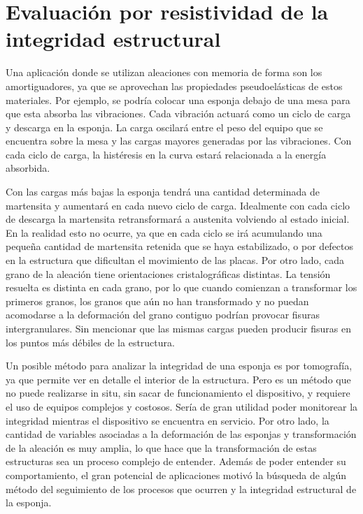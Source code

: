 \documentclass[a4paper,12pt,fleqn,twoside,openany]{book}
\begin{document}
\section{Evaluación por resistividad de la integridad estructural}


Una aplicación donde se utilizan aleaciones con memoria de forma son los amortiguadores, ya que se aprovechan las propiedades pseudoelásticas de estos materiales. Por ejemplo, se podría colocar una esponja debajo de una mesa para que esta absorba las vibraciones. Cada vibración actuará como un ciclo de carga y descarga en la esponja. 
La carga oscilará entre el peso del equipo que se encuentra sobre la mesa y las cargas mayores generadas por las vibraciones.
Con cada ciclo de carga, la histéresis en la curva estará relacionada a la energía absorbida.  

Con las cargas más bajas la esponja tendrá una cantidad determinada de martensita y aumentará en cada nuevo ciclo de carga. Idealmente con cada ciclo de descarga la martensita retransformará a austenita volviendo al estado inicial. En la realidad esto no ocurre, ya que en cada ciclo se irá acumulando una pequeña cantidad de martensita retenida que se haya estabilizado, o por defectos en la estructura que dificultan el movimiento de las placas. Por otro lado, cada grano de la aleación tiene orientaciones cristalográficas distintas. La tensión resuelta es distinta en cada grano, por lo que cuando comienzan a transformar los primeros granos, los granos que aún no han transformado y no puedan acomodarse a la deformación del grano contiguo podrían provocar fisuras intergranulares. Sin mencionar que las mismas cargas pueden producir fisuras en los puntos más débiles de la estructura. 

Un posible método para analizar la integridad de una esponja es por tomografía, ya que permite ver en detalle el interior de la estructura. Pero es un método  que no puede realizarse in situ, sin sacar de funcionamiento el dispositivo, y requiere el uso de equipos complejos y costosos. Sería de gran utilidad poder monitorear la integridad mientras el dispositivo se encuentra en servicio. Por otro lado, la cantidad de variables asociadas a la deformación de las esponjas y transformación de la aleación es muy amplia, lo que hace que la transformación de estas estructuras sea un proceso complejo de entender. Además de poder entender su comportamiento, el gran potencial de aplicaciones motivó la búsqueda de algún método del seguimiento de los procesos que ocurren y la integridad estructural de la esponja.
\end{document}
